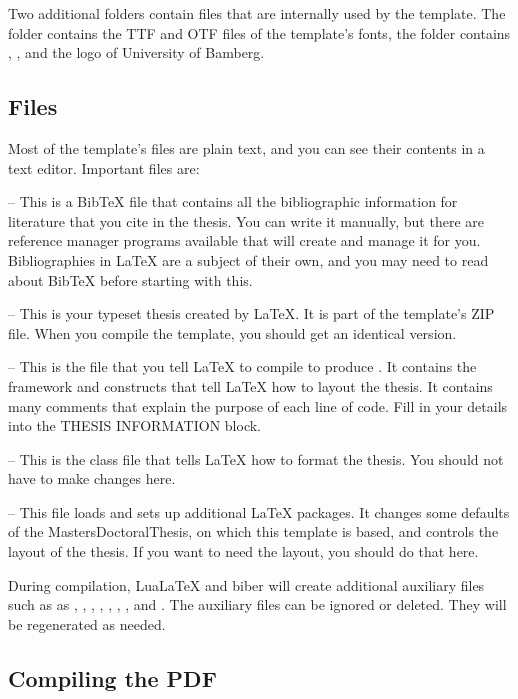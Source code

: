 Two additional folders contain files that are internally used by the template. The folder  contains the TTF and OTF files of the template's fonts, the folder  contains , , and the logo of University of Bamberg.

\subsection{Files}
\label{sec:files}

Most of the template's files are plain text, and you can see their contents in a text editor. Important files are:

 -- This is a BibTeX file that contains all the bibliographic information for literature that you cite in the thesis. You can write it manually, but there are reference manager programs available that will create and manage it for you. Bibliographies in LaTeX are a subject of their own, and you may need to read about BibTeX before starting with this.

 -- This is your typeset thesis created by LaTeX. It is part of the template's ZIP file. When you compile the template, you should get an identical version.

 -- This is the file that you tell LaTeX to compile to produce . It contains the framework and constructs that tell LaTeX how to layout the thesis. It contains many comments that explain the purpose of each line of code. Fill in your details into the THESIS INFORMATION block.

 -- This is the class file that tells LaTeX how to format the thesis. You should not have to make changes here.

 -- This file loads and sets up additional LaTeX packages. It changes some defaults of the MastersDoctoralThesis, on which this template is based, and controls the layout of the thesis. If you want to need the layout, you should do that here.

During compilation, LuaLaTeX and biber will create additional auxiliary files such as as
, , , ,
, , , and .
The auxiliary files can be ignored or deleted. They will be regenerated  as needed.


\subsection{Compiling the PDF}
\label{sec:compile}

